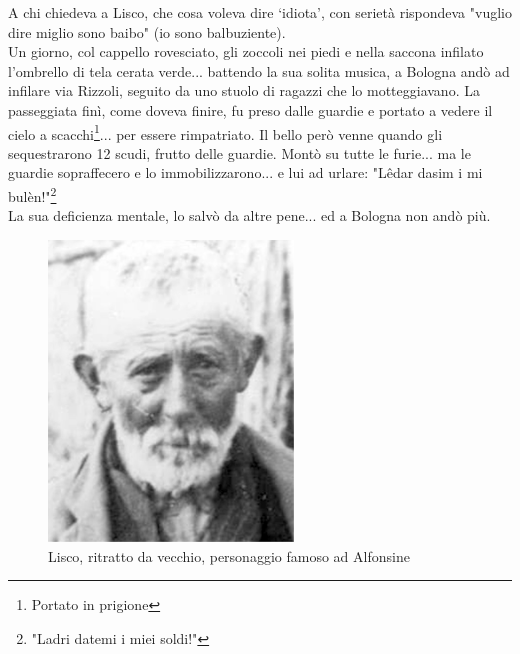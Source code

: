 \documentclass[10pt]{memoir} %
\begin{document}
A chi chiedeva a Lisco, che cosa voleva dire ‘idiota', con serietà rispondeva "vuglio dire miglio sono baibo" (io sono balbuziente).\\
Un giorno, col cappello rovesciato, gli zoccoli nei piedi e nella saccona infilato l'ombrello di tela cerata verde... battendo la sua solita musica, a Bologna andò ad infilare via Rizzoli, seguito da uno stuolo di ragazzi che lo motteggiavano. La passeggiata finì, come doveva finire, fu preso dalle guardie e portato a vedere il cielo a scacchi\footnote{Portato in prigione}... per essere rimpatriato. Il bello però venne quando gli sequestrarono 12 scudi, frutto delle guardie. Montò su tutte le furie... ma le guardie sopraffecero e lo immobilizzarono... e lui ad urlare: "Lêdar dasim i mi bulèn!"\footnote{"Ladri datemi i miei soldi!"}\\
La sua deficienza mentale, lo salvò da altre pene... ed a Bologna non andò più.\\

 \begin{figure}[htb]
    \centering
    \includegraphics[height=8cm]{Lisco}
    \caption{Lisco, ritratto da vecchio, personaggio famoso ad Alfonsine\label{fig:Lisco}}
\end{figure}



\end{document}
